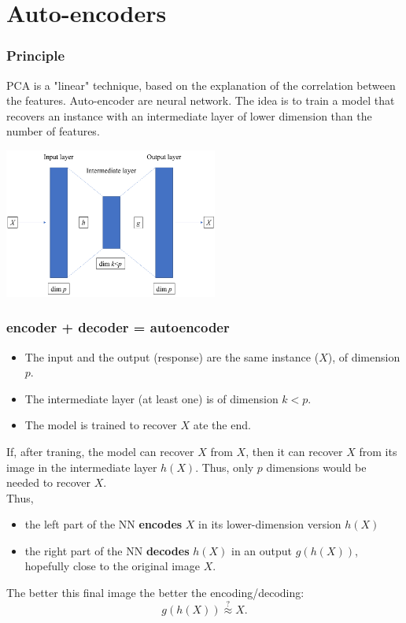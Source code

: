 \section{Auto-encoders}
\begin{frame}
\frametitle{Principle}
PCA is a "linear" technique, based on the explanation of the correlation between the features. Auto-encoder are neural network. The idea is to train a model that recovers an instance with an intermediate layer of lower dimension than the number of features.\\
\begin{center}
\includegraphics[width=7cm]{../../Graphs/autoencod_illustr.png}
\end{center}
\end{frame}
\begin{frame}
\frametitle{encoder + decoder = autoencoder}
\begin{itemize}
\item The input and the output (response) are the same instance ($X$), of dimension $p$.
\item The intermediate layer (at least one) is of dimension $k<p$.
\item The model is trained to recover $X$ ate the end.
\end{itemize}
If, after traning, the model can recover $X$ from $X$, then it can recover $X$ from its image in the intermediate layer $h(X)$. Thus, only $p$ dimensions would be needed to recover $X$. \\
\vspace{0.2cm}
Thus, 
\begin{itemize}
\item the left part of the NN {\bf encodes} $X$ in its lower-dimension version $h(X)$
\item the right part of the NN {\bf decodes} $h(X)$ in an output $g(h(X))$, hopefully close to the original image $X$.
\end{itemize}
The better this final image the better the encoding/decoding:
$$
g(h(X)) \stackrel{?}{\approx} X.
$$
\end{frame}
